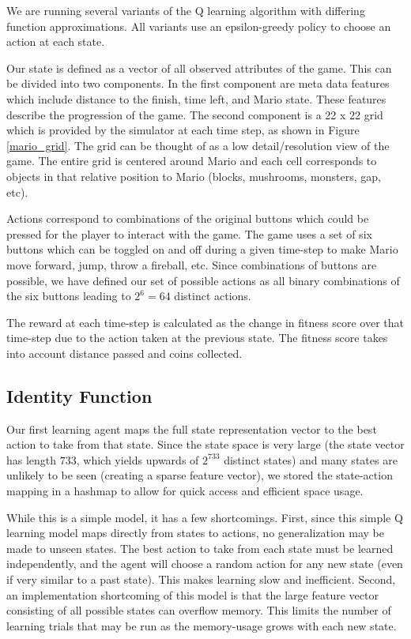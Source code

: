 \documentclass[12pt]{article}
\begin{document}
We are running several variants of the Q learning algorithm with differing function approximations. All variants use an epsilon-greedy policy to choose an action at each state.

Our state is defined as a vector of all observed attributes of the game. This can be divided into two components. In the first component are meta data features which include distance to the finish, time left, and Mario state. These features describe the progression of the game. The second component is a 22 x 22 grid which is provided by the simulator at each time step, as shown in Figure \ref{mario_grid}. The grid can be thought of as a low detail/resolution view of the game. The entire grid is centered around Mario and each cell corresponds to objects in that relative position to Mario (blocks, mushrooms, monsters, gap, etc).

Actions correspond to combinations of the original buttons which could be pressed for the player to interact with the game. The game uses a set of six buttons which can be toggled on and off during a given time-step to make Mario move forward, jump, throw a fireball, etc. Since combinations of buttons are possible, we have defined our set of possible actions as all binary combinations of the six buttons leading to $2^6 = 64$ distinct actions.

The reward at each time-step is calculated as the change in fitness score over that time-step due to the action taken at the previous state. The fitness score takes into account distance passed and coins collected.

\subsection{Identity Function}

Our first learning agent maps the full state representation vector to the best action to take from that state. Since the state space is very large (the state vector has length $733$, which yields upwards of $2^{733}$ distinct states) and many states are unlikely to be seen (creating a sparse feature vector), we stored the state-action mapping in a hashmap to allow for quick access and efficient space usage.

While this is a simple model, it has a few shortcomings. First, since this simple Q learning model maps directly from states to actions, no generalization may be made to unseen states. The best action to take from each state must be learned independently, and the agent will choose a random action for any new state (even if very similar to a past state). This makes learning slow and inefficient. Second, an implementation shortcoming of this model is that the large feature vector consisting of all possible states can overflow memory. This limits the number of learning trials that may be run as the memory-usage grows with each new state.
\end{document}
